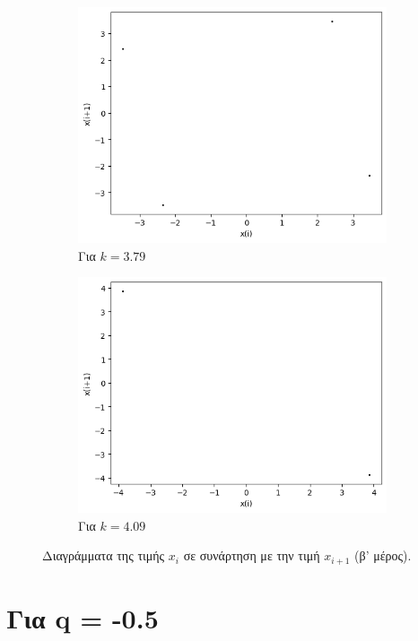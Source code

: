 \begin{figure}[ht]
\begin{subfigure}[b]{0.4\textwidth}
		\includegraphics[width=\textwidth]{LateX images/sine q=-0.3/g12}
		\caption{Για $k=3.79$}
		\label{f:k125}
	\end{subfigure}
	\hfill
	\begin{subfigure}[b]{0.4\textwidth}
		\centering
		\includegraphics[width=\textwidth]{LateX images/sine q=-0.3/g13}
		\caption{Για $k=4.09$}
		\label{f:k126}
	\end{subfigure}
	\hfill
	\caption{Διαγράμματα της τιμής \(x_i\) σε συνάρτηση με την τιμή \(x_{i+1}\) (β' μέρος).}
	\label{f:k247}
\end{figure}

\clearpage 
\section{Για q = -0.5}

